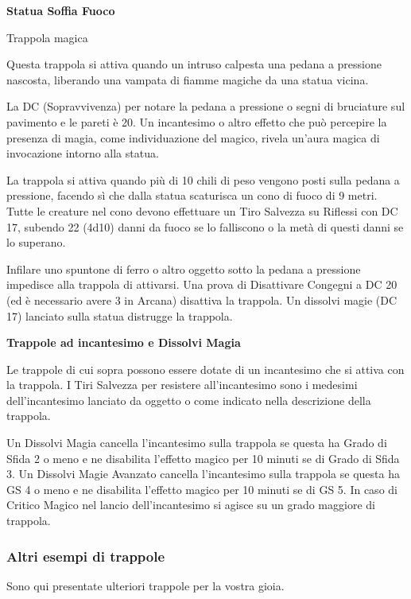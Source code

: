 \begin{multicols}{2}
\medskip

\textbf{Statua Soffia Fuoco}

Trappola magica

Questa trappola si attiva quando un intruso calpesta una pedana a pressione nascosta, liberando una vampata di fiamme magiche da una statua vicina.

La DC (Sopravvivenza) per notare la pedana a pressione o segni di bruciature sul pavimento e le pareti è 20. Un incantesimo o altro effetto che può percepire la presenza di magia, come individuazione del magico, rivela un'aura magica di invocazione intorno alla statua.

La trappola si attiva quando più di 10 chili di peso vengono posti sulla pedana a pressione, facendo sì che dalla statua scaturisca un cono di fuoco di 9 metri. Tutte le creature nel cono devono effettuare un Tiro Salvezza su Riflessi con DC 17, subendo 22 (4d10) danni da fuoco se lo falliscono o la metà di questi danni se lo superano.

Infilare uno spuntone di ferro o altro oggetto sotto la pedana a pressione impedisce alla trappola di attivarsi. Una prova di Disattivare Congegni a DC 20 (ed è necessario avere 3 in Arcana) disattiva la trappola. Un dissolvi magie (DC 17) lanciato sulla statua distrugge la trappola.

\medskip

\textbf{Trappole ad incantesimo e Dissolvi Magia}

Le trappole di cui sopra possono essere dotate di un incantesimo che si attiva con la trappola.
I Tiri Salvezza per resistere all'incantesimo sono i medesimi dell'incantesimo lanciato da oggetto o come indicato nella descrizione della trappola.

Un Dissolvi Magia cancella l'incantesimo sulla trappola se questa ha Grado di Sfida 2 o meno e ne disabilita l'effetto magico per 10 minuti se di Grado di Sfida 3.
Un Dissolvi Magie Avanzato cancella l'incantesimo sulla trappola se questa ha GS 4 o meno e ne disabilita l'effetto magico per 10 minuti se di GS 5. In caso di Critico Magico nel lancio dell'incantesimo si agisce su un grado maggiore di trappola.

\subsubsection{Altri esempi di trappole}

Sono qui presentate ulteriori trappole per la vostra gioia.


\end{multicols}
